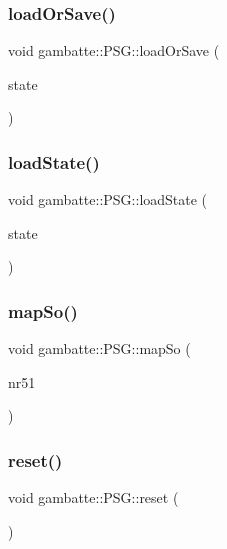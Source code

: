 \subsubsection{\texorpdfstring{load\+Or\+Save()}{loadOrSave()}}
{\footnotesize\ttfamily void gambatte\+::\+P\+S\+G\+::load\+Or\+Save (\begin{DoxyParamCaption}\item[{\hyperlink{classgambatte_1_1loadsave}{loadsave} \&}]{state }\end{DoxyParamCaption})}

\mbox{\label{classgambatte_1_1PSG_a302cc5f1d4500deaee2ba342e6470b47}} 
\subsubsection{\texorpdfstring{load\+State()}{loadState()}}
{\footnotesize\ttfamily void gambatte\+::\+P\+S\+G\+::load\+State (\begin{DoxyParamCaption}\item[{\hyperlink{structgambatte_1_1SaveState}{Save\+State} const \&}]{state }\end{DoxyParamCaption})}

\mbox{\label{classgambatte_1_1PSG_a32c30ebd36d8ddce3cbfac37ff8f7bb8}} 
\subsubsection{\texorpdfstring{map\+So()}{mapSo()}}
{\footnotesize\ttfamily void gambatte\+::\+P\+S\+G\+::map\+So (\begin{DoxyParamCaption}\item[{unsigned}]{nr51 }\end{DoxyParamCaption})}

\mbox{\label{classgambatte_1_1PSG_af899b7b1de13a7abb0f1aa3e33be7dd1}} 
\subsubsection{\texorpdfstring{reset()}{reset()}}
{\footnotesize\ttfamily void gambatte\+::\+P\+S\+G\+::reset (\begin{DoxyParamCaption}{ }\end{DoxyParamCaption})}

